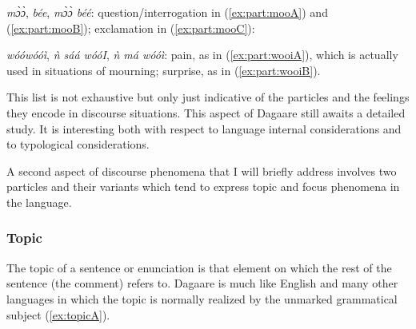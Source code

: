 \noindent \textit{mɔ̀ɔ̀}, \textit{bée}, \textit{mɔ̀ɔ̀ béé}: question/interrogation in (\ref{ex:part:mooA}) and (\ref{ex:part:mooB}); exclamation in (\ref{ex:part:mooC}):


\ea {}
\z\z 

\noindent \textit{wóówóóì}, \textit{ǹ sáá wóóI}, \textit{ǹ má wóóì}: pain, as in (\ref{ex:part:wooiA}), which is actually used in situations
of mourning; surprise, as in (\ref{ex:part:wooiB}).


\ea {}
\z\z 

This list is not exhaustive but only just indicative of the particles and the feelings they encode
in discourse situations. This aspect of Dagaare still awaits a detailed study. It is interesting
both with respect to language internal considerations and to typological considerations.

A second aspect of discourse phenomena that I will briefly address involves two
particles and their variants which tend to express topic and focus phenomena in the language.

\subsubsection{ Topic}

The topic of a sentence or enunciation is that element on which the rest of the sentence
(the comment) refers to. Dagaare is much like English and many other languages in which
the topic is normally realized by the unmarked grammatical subject (\ref{ex:topicA}).

